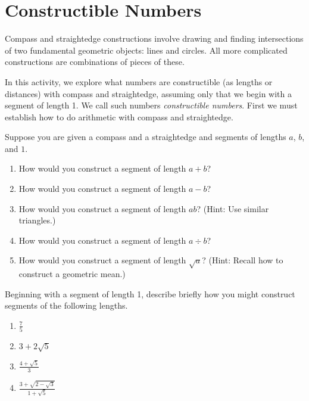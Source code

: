 \newpage
\section{Constructible Numbers}
Compass and straightedge constructions involve drawing and finding intersections of two fundamental geometric objects:  lines and circles.  All more complicated constructions are combinations of pieces of these.  

In this activity, we explore what numbers are constructible (as lengths or distances) with compass and straightedge, assuming only that we begin with a segment of length 1.  We call such numbers \textit{constructible numbers}.  First we must establish how to do arithmetic with compass and straightedge.  
\begin{prob}
Suppose you are given a compass and a straightedge and segments of lengths $a$, $b$, and $1$.  
\begin{enumerate}
\item How would you construct a segment of length $a+b$? 
\item How would you construct a segment of length $a-b$? 
\item How would you construct a segment of length $ab$?  (Hint:  Use similar triangles.)  
\item How would you construct a segment of length $a\div b$? 
\item How would you construct a segment of length $\sqrt{a}$?  (Hint: Recall how to construct a geometric mean.)  
\end{enumerate}
\end{prob}

\begin{prob}
Beginning with a segment of length 1, describe briefly how you might construct segments of the following lengths.
\begin{enumerate}
\item $\frac{7}{5}$
\item $3+2\sqrt{5}$
\item $\frac{4+\sqrt{5}}{3}$
\item $\frac{3 + \sqrt{2-\sqrt{3}}}{1+\sqrt{5}}$
\end{enumerate}
\end{prob}

